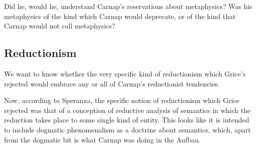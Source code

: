 \documentclass{article}
\begin{document}
Did he, would he, understand Carnap's reservations about metaphysics?
Was his metaphysics of the kind which Carnap would deprecate, or of the kind that Carnap would not call metaphysics?

\subsection{Reductionism}

We want to know whether the very specific kind of reductionism which Grice's rejected would embrace any or all of Carnap's reductionist tendencies.

Now, according to Speranxa, the specific notion of reductionism which Grice rejected was that of a conception of reductive analysis of semantics in which the reduction takes place to some single kind of entity.
This looks like it is intended to include dogmatic phenomenalism as a doctrine about semantics, which, apart from the dogmatic bit is what Carnap was doing in the Aufbau.



{\raggedright


} %
\end{document}
